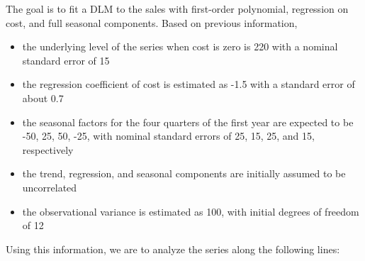\documentclass{article}
\begin{document}
	The goal is to fit a DLM to the sales with first-order polynomial, regression on cost, and full seasonal components. Based on previous information, 
	\begin{itemize}
		\item the underlying level of the series when cost is zero is 220 with a nominal standard error of 15
		\item the regression coefficient of cost is estimated as -1.5 with a standard error of about 0.7
		\item the seasonal factors for the four quarters of the first year are expected to be -50, 25, 50, -25, with nominal standard errors of 25, 15, 25, and 15, respectively
		\item the trend, regression, and seasonal components are initially assumed to be uncorrelated
		\item the observational variance is estimated as 100, with initial degrees of freedom of 12
	\end{itemize}
	Using this information, we are to analyze the series along the following lines:
\end{document}

